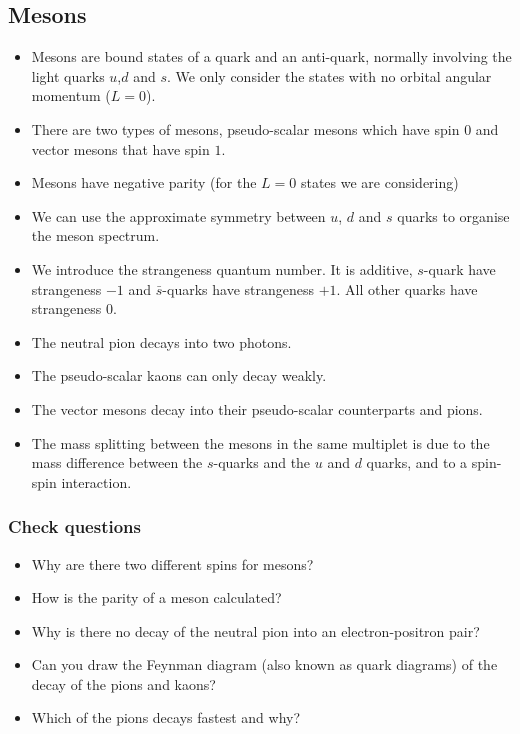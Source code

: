\documentclass[12pt]{article}
\begin{document}
\subsection{Mesons}
\begin{itemize}
\item Mesons are bound states of a quark and an anti-quark, normally involving the light quarks $u$,$d$ and $s$. We only consider the states with no orbital angular momentum ($L=0$). 
\item There are two types of mesons, pseudo-scalar mesons which have spin $0$ and vector mesons that have spin $1$.
  \item Mesons have negative parity (for the $L=0$ states we are considering)
  \item We can use the approximate symmetry between $u$, $d$ and $s$ quarks to organise the meson spectrum.
  \item We introduce the strangeness quantum number. It is additive, $s$-quark have strangeness $-1$ and $\bar{s}$-quarks have strangeness $+1$. All other quarks have strangeness $0$.
  \item The neutral pion decays into two photons.
  \item The pseudo-scalar kaons can only decay weakly.
  \item The vector mesons decay into their pseudo-scalar counterparts and pions.
    \item The mass splitting between the mesons in the same multiplet is due to the mass difference between the $s$-quarks and the $u$ and $d$ quarks, and to a spin-spin interaction.
\end{itemize}
\subsubsection{Check questions}
\begin{itemize}
  \item Why are there two different spins for mesons?
  \item How is the parity of a meson calculated?
    \item Why is there no decay of the neutral pion into an electron-positron pair?
  \item Can you draw the Feynman diagram (also known as quark diagrams) of the decay of the pions and kaons?
    
    \item Which of the pions decays fastest and why?  
\end{itemize}
\end{document}

